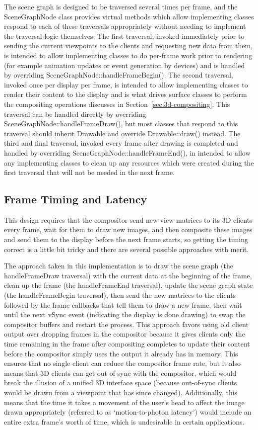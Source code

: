 The scene graph is designed to be traversed several times per frame, and the SceneGraphNode class provides virtual methods which allow implementing classes respond to each of these traversals appropriately without needing to implement the traversal logic themselves. The first traversal, invoked immediately prior to sending the current viewpoints to the clients and requesting new data from them, is intended to allow implementing classes to do per-frame work prior to rendering (for example animation updates or event generation by devices) and is handled by overriding SceneGraphNode::handleFrameBegin(). The second traversal, invoked once per display per frame, is intended to allow implementing classes to render their content to the display and is what drives surface classes to perform the compositing operations discusses in Section~\ref{sec:3d-compositing}. This traversal can be handled directly by overriding SceneGraphNode::handleFrameDraw(), but most classes that respond to this traversal should inherit Drawable and override Drawable::draw() instead. The third and final traversal, invoked every frame after drawing is completed and handled by overriding SceneGraphNode::handleFrameEnd(), in intended to allow any implementing classes to clean up any resources which were created during the first traversal that will not be needed in the next frame.

\subsection{Frame Timing and Latency}

This design requires that the compositor send new view matrices to its 3D clients every frame, wait for them to draw new images, and then composite these images and send them to the display before the next frame starts, so getting the timing correct is a little bit tricky and there are several possible approaches with merit. 

The approach taken in this implementation is to draw the scene graph (the handleFrameDraw traversal) with the current data at the beginning of the frame, clean up the frame (the handleFrameEnd traversal), update the scene graph state (the handleFrameBegin traversal), then send the new matrices to the clients followed by the frame callbacks that tell them to draw a new frame, then wait until the next vSync event (indicating the display is done drawing) to swap the compositor buffers and restart the process. This approach favors using old client output over dropping frames in the compositor because it gives clients only the time remaining in the frame after compositing completes to update their content before the compositor simply uses the output it already has in memory. This ensures that no single client can reduce the compositor frame rate, but it also means that 3D clients can get out of sync with the compositor, which would break the illusion of a unified 3D interface space (because out-of-sync clients would be drawn from a viewpoint that has since changed). Additionally, this means that the time it takes a movement of the user's head to affect the image drawn appropriately (referred to as `motion-to-photon latency') would include an entire extra frame's worth of time, which is undesirable in certain applications.

